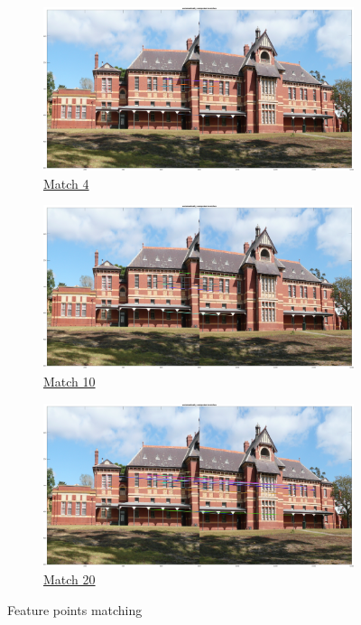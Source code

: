 \begin{figure}
	\centering
	\begin{subfigure}[t]{0.7\textwidth}
	    \centering
		\includegraphics[width=\textwidth]{hw2/problem3/match_4.png}
		\caption{\href{./hw2/problem3/match_4.png}{Match 4}}\label{fig:9a}
	\end{subfigure}
	\begin{subfigure}[t]{0.7\textwidth}
	    \centering
		\includegraphics[width=\textwidth]{hw2/problem3/match_10.png}
		\caption{\href{./hw2/problem3/match_10.png}{Match 10}}\label{fig:9b}
	\end{subfigure}
	\begin{subfigure}[t]{0.7\textwidth}
	    \centering
		\includegraphics[width=\textwidth]{hw2/problem3/match_20.png}
		\caption{\href{./hw2/problem3/match_20.png}{Match 20}}\label{fig:9c}
	\end{subfigure}
	\caption{Feature points matching}\label{fig:9}
\end{figure}